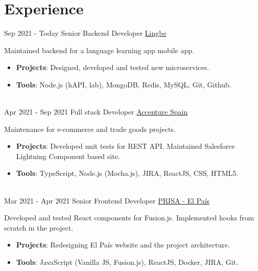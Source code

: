 \documentclass[letterpaper]{twentysecondcv} %
\begin{document}
\makeprofile %
 

\section{Experience}
\begin{twenty} %
    \twentyitem
    	{Sep 2021 -}
		{Today}
        {Senior Backend Developer}
        {\href{https://www.lingbe.com/}{Lingbe}}
        {}
        {Maintained backend for a language learning app mobile app.
        {\begin{itemize}
        \item \textbf{Projects}: Designed, developed and tested new microservices.
        \item \textbf{Tools}: Node.js (hAPI, lab), MongoDB, Redis, MySQL, Git, Github.
        \end{itemize}}}
        \\
    \twentyitem
    	{Apr 2021 -}
		{Sep 2021}
        {Full stack Developer}
        {\href{https://www.accenture.com/es-es}{Accenture Spain}}
        {}
        {Maintenance for e-commerce and trade goods projects.
        {\begin{itemize}
        \item \textbf{Projects}: Developed unit tests for REST API. Maintained Salesforce Lightning Component based site.
        \item \textbf{Tools}: TypeScript, Node.js (Mocha.js), JIRA, ReactJS, CSS, HTML5.
        \end{itemize}}}
        \\
    \twentyitem
    	{Mar 2021 -}
		{Apr 2021}
        {Senior Frontend Developer}
        {\href{https://www.prisa.com/}{PRISA - El Pa\'is}}
        {}
        {Developed and tested React components for Fusion.js. Implemented hooks from scratch in the project.
        \begin{itemize}
        \item \textbf{Projects}: Redesigning El Pa\'is website and the project architecture.
        \item \textbf{Tools}: JavaScript (Vanilla JS, Fusion.js), ReactJS, Docker, JIRA, Git.
        \end{itemize}}
        \\

\end{twenty}
\end{document}
